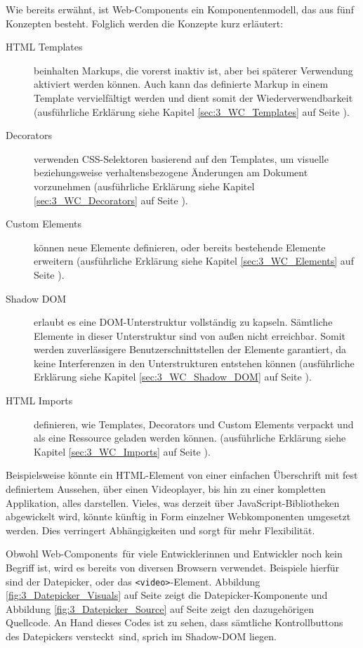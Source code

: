 Wie bereits erwähnt, ist Web-Components ein Komponentenmodell, das aus fünf Konzepten besteht. Folglich werden die Konzepte kurz erläutert:
\begin{description}
\item[HTML Templates] beinhalten Markups, die vorerst inaktiv ist, aber bei späterer Verwendung aktiviert werden können. Auch kann das definierte Markup in einem Template vervielfältigt werden und dient somit der Wiederverwendbarkeit (ausführliche Erklärung siehe Kapitel \ref{sec:3_WC_Templates} auf Seite \pageref{sec:3_WC_Templates}).
\item[Decorators] verwenden CSS-Selektoren basierend auf den Templates, um visuelle beziehungsweise verhaltensbezogene Änderungen am Dokument vorzunehmen (ausführliche Erklärung siehe Kapitel \ref{sec:3_WC_Decorators} auf Seite \pageref{sec:3_WC_Decorators}).
\item[Custom Elements] können neue Elemente definieren, oder bereits bestehende Elemente erweitern (ausführliche Erklärung siehe Kapitel \ref{sec:3_WC_Elements} auf Seite \pageref{sec:3_WC_Elements}).
\item[Shadow DOM] erlaubt es eine DOM-Unterstruktur vollständig zu kapseln. Sämtliche Elemente in dieser Unterstruktur sind von außen nicht erreichbar. Somit werden zuverlässigere Benutzerschnittstellen der Elemente garantiert, da keine Interferenzen in den Unterstrukturen entstehen können (ausführliche Erklärung siehe Kapitel \ref{sec:3_WC_Shadow_DOM} auf Seite \pageref{sec:3_WC_Shadow_DOM}).
\item[HTML Imports] definieren, wie Templates, Decorators und Custom Elements verpackt und als eine Ressource geladen werden können. (ausführliche Erklärung siehe Kapitel \ref{sec:3_WC_Imports} auf Seite \pageref{sec:3_WC_Imports}).
\end{description}

Beispielsweise könnte ein HTML-Element von einer einfachen Überschrift mit fest definiertem Aussehen, über einen Videoplayer, bis hin zu einer kompletten Applikation, alles darstellen. Vieles, was derzeit über JavaScript-Bibliotheken abgewickelt wird, könnte künftig in Form einzelner Webkomponenten umgesetzt werden. Dies verringert Abhängigkeiten und sorgt für mehr Flexibilität.

Obwohl \glqq Web-Components\grqq\ für viele Entwicklerinnen und Entwickler noch kein Begriff ist, wird es bereits von diversen Browsern verwendet. Beispiele hierfür sind der \glqq Datepicker\grqq , oder das \lstinline|<video>|-Element. Abbildung \ref{fig:3_Datepicker_Visuals} auf Seite \pageref{fig:3_Datepicker_Visuals} zeigt die Datepicker-Komponente und Abbildung \ref{fig:3_Datepicker_Source} auf Seite \pageref{fig:3_Datepicker_Source} zeigt den dazugehörigen Quellcode. An Hand dieses Codes ist zu sehen, dass sämtliche Kontrollbuttons des Datepickers \glqq versteckt\grqq\ sind, sprich im Shadow-DOM liegen.


